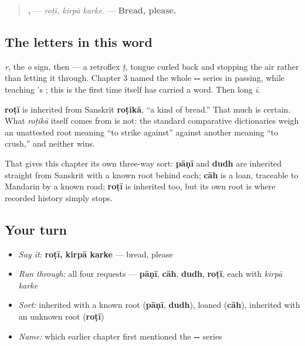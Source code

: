 \begin{quote}
\textbf{,  } — \emph{roṭī, kirpā karke.} — \textbf{Bread, please.}
\end{quote}

\subsection*{The letters in this word}
\textbf{} \emph{r}, \textbf{} the \emph{o} sign, then \textbf{} — a retroflex \emph{ṭ}, tongue curled back and stopping the air rather than letting it through. Chapter 3 named the whole \textbf{--} series in passing, while teaching \textbf{}'s \textbf{}; this is the first time \textbf{} itself has carried a word. Then \textbf{} long \emph{ī}.

\begin{cousinweb}
\textbf{roṭī} is inherited from Sanskrit \textbf{roṭikā}, \textquotedblleft{}a kind of bread.\textquotedblright{} That much is certain. What \emph{roṭikā} itself comes from is not: the standard comparative dictionaries weigh an unattested root meaning \textquotedblleft{}to strike against\textquotedblright{} against another meaning \textquotedblleft{}to crush,\textquotedblright{} and neither wins.

That gives this chapter its own three-way sort: \textbf{pāṇī} and \textbf{dudh} are inherited straight from Sanskrit with a known root behind each; \textbf{cāh} is a loan, traceable to Mandarin by a known road; \textbf{roṭī} is inherited too, but its own root is where recorded history simply stops.
\end{cousinweb}

\subsection*{Your turn}
\begin{itemize}
\raggedright
  \item \emph{Say it:} \textbf{roṭī, kirpā karke} — bread, please
  \item \emph{Run through:} all four requests — \textbf{pāṇī}, \textbf{cāh}, \textbf{dudh}, \textbf{roṭī}, each with \emph{kirpā karke}
  \item \emph{Sort:} inherited with a known root (\textbf{pāṇī}, \textbf{dudh}), loaned (\textbf{cāh}), inherited with an unknown root (\textbf{roṭī})
  \item \emph{Name:} which earlier chapter first mentioned the \textbf{--} series
\end{itemize}

